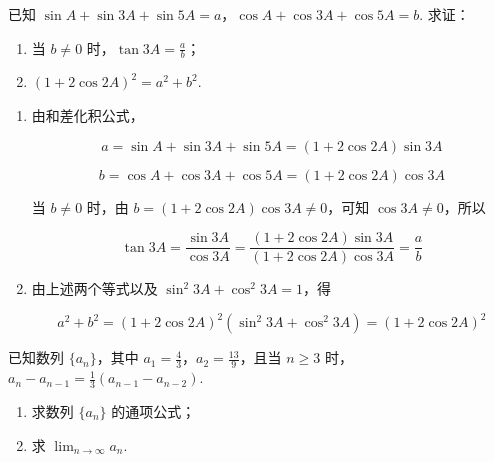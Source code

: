 \documentclass[UTF8,a4paper,oneside,11pt]{ctexbook}
\begin{document}
\begin{problem}
已知 \(\sin A + \sin 3A + \sin 5A = a\)，\(\cos A + \cos 3A + \cos 5A = b\). 求证：

\begin{enumerate}
\item 当 \(b \neq 0\) 时，\(\tan 3A = \frac{a}{b}\)；
\item \(\left(1 + 2\cos 2A\right)^2 = a^2 + b^2\).
\end{enumerate}
\end{problem}

\begin{solution}
\begin{enumerate}
\item 由和差化积公式，

\[
a=\sin A+\sin 3A+\sin 5A=\left(1+2\cos 2A\right)\sin 3A
\]

\[
b=\cos A+\cos 3A+\cos 5A=\left(1+2\cos 2A\right)\cos 3A
\]

当 \(b\neq0\) 时，由 \(b=\left(1+2\cos 2A\right)\cos 3A\neq0\)，可知 \(\cos 3A\neq0\)，所以

\[
\tan 3A=\frac{\sin 3A}{\cos 3A}=\frac{\left(1+2\cos 2A\right)\sin 3A}{\left(1+2\cos 2A\right)\cos 3A}=\frac{a}{b}
\]

\item 由上述两个等式以及 \(\sin^2 3A+\cos^2 3A=1\)，得

\[
a^2+b^2=\left(1+2\cos 2A\right)^2\left(\sin^2 3A+\cos^2 3A\right)=\left(1+2\cos 2A\right)^2
\]

\end{enumerate}
\end{solution}

\begin{problem}
已知数列 \(\{a_n\}\)，其中 \(a_1 = \frac{4}{3}\)，\(a_2 = \frac{13}{9}\)，且当 \(n \geqslant 3\) 时，\(a_n - a_{n-1} = \frac{1}{3}\left(a_{n-1} - a_{n-2}\right)\).

\begin{enumerate}
\item 求数列 \(\{a_n\}\) 的通项公式；
\item 求 \(\displaystyle\lim_{n\to\infty} a_n\).
\end{enumerate}
\end{problem}
\end{document}
